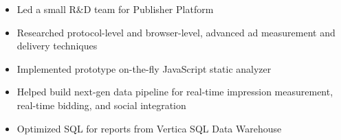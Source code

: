 \documentclass[10pt,a4paper,ragged2e,withhyper]{altacv}
\begin{document}
\begin{paracol}{2}
\divider

\begin{itemize}
  \item Led a small R\&D team for Publisher Platform
  \item Researched protocol-level and browser-level, advanced ad measurement and delivery techniques
  \item Implemented prototype on-the-fly JavaScript static analyzer
  \item Helped build next-gen data pipeline for real-time impression measurement, real-time bidding, and social integration
  \item Optimized SQL for reports from Vertica SQL Data Warehouse
\end{itemize}




%


\end{paracol}
\end{document}
